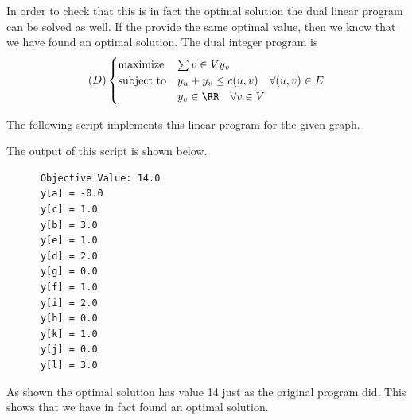 \documentclass[11pt, oneside]{article}
\begin{document}
\begin{enumerate}
    In order to check that this is in fact the optimal solution the dual linear
    program can be solved as well.
    If the provide the same optimal value, then we know that we have found
    an optimal solution.
    The dual integer program is
    \[
      (D)
      \begin{cases}
        \text{maximize} & \sum{v \in V}{}{y_v} \\
        \text{subject to} & y_u + y_v \le c(u,v) \quad \forall (u, v) \in E \\
                          & y_v \in \RR \quad \forall v \in V
      \end{cases}
    \]

    The following script implements this linear program for the given graph.
    
    The output of this script is shown below.
    \begin{verbatim}
      Objective Value: 14.0
      y[a] = -0.0
      y[c] = 1.0
      y[b] = 3.0
      y[e] = 1.0
      y[d] = 2.0
      y[g] = 0.0
      y[f] = 1.0
      y[i] = 2.0
      y[h] = 0.0
      y[k] = 1.0
      y[j] = 0.0
      y[l] = 3.0
    \end{verbatim}
    As shown the optimal solution has value 14 just as the original program did.
    This shows that we have in fact found an optimal solution.
\end{enumerate}
\end{document}
